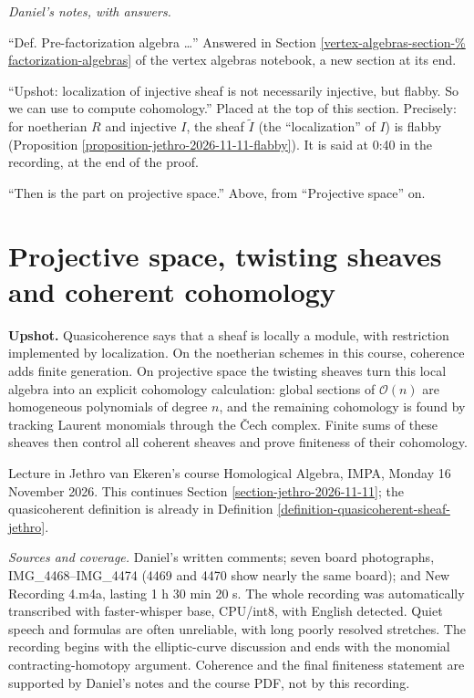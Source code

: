 \medskip\noindent
\textit{Daniel's notes, with answers.}

``Def. Pre-factorization algebra
\ldots'' Answered in Section
\ref{vertex-algebras-section-%
factorization-algebras}
of the vertex algebras notebook, a new
section at its end.

``Upshot: localization of injective sheaf is
not necessarily injective, but flabby. So we
can use to compute cohomology.'' Placed at
the top of this section. Precisely: for
noetherian $R$ and injective $I$, the sheaf
$\widetilde{I}$ (the ``localization'' of
$I$) is flabby (Proposition
\ref{proposition-jethro-2026-11-11-flabby}).
It is said at 0:40 in the recording, at the
end of the proof.

``Then is the part on projective space.''
Above, from ``Projective space'' on.

\section{Projective space, twisting sheaves
and coherent cohomology}
\label{section-jethro-2026-11-16}

\noindent
{\bf Upshot.} Quasicoherence says that a
sheaf is locally a module, with restriction
implemented by localization. On the
noetherian schemes in this course,
coherence adds finite generation. On
projective space the twisting sheaves turn
this local algebra into an explicit
cohomology calculation: global sections of
$\mathcal{O}(n)$ are homogeneous polynomials
of degree $n$, and the remaining
cohomology is found by tracking Laurent
monomials through the \v{C}ech complex.
Finite sums of these sheaves then control
all coherent sheaves and prove finiteness
of their cohomology.

\medskip
Lecture in Jethro van Ekeren's course
Homological Algebra, IMPA, Monday
16 November 2026. This continues Section
\ref{section-jethro-2026-11-11}; the
quasicoherent definition is already in
Definition
\ref{definition-quasicoherent-sheaf-jethro}.

\textit{Sources and coverage.} Daniel's
written comments; seven board photographs,
IMG\_4468--IMG\_4474 (4469 and 4470 show
nearly the same board); and New Recording
4.m4a, lasting 1 h 30 min 20 s. The whole
recording was automatically transcribed
with faster-whisper base, CPU/int8, with
English detected. Quiet speech and formulas
are often unreliable, with long poorly
resolved stretches. The recording begins
with the elliptic-curve discussion and ends
with the monomial contracting-homotopy
argument. Coherence and the final finiteness
statement are supported by Daniel's notes
and the course PDF, not by this recording.

